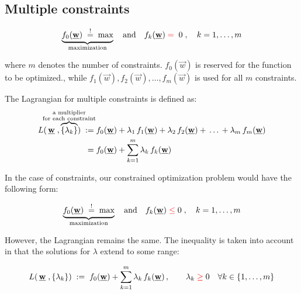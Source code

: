 \subsection{Multiple constraints}

\begin{frame}
 

\slidesonly{\vspace{-2mm}}
    
\begin{equation}
\underbrace{f_0(\vec w) \;\eqexcl\; \text{max}}_{\text{maximization}} \quad  \text{and} \quad f_k(\vec w)\;{\color{red}{=}}\; \; 0 \;, \quad k = 1,\ldots,m
\label{eq:optimizationequalitymultipe}
\end{equation}

where $m$ denotes the number of constraints. $f_{0}(\vec w)$ is reserved for the function to be optimized., while $f_{1}(\vec w), f_{2}(\vec w),\ldots,f_{m}(\vec w)$ is used for all $m$ constraints.

The Lagrangian for multiple constraints is defined as:
\begin{align}
L(\,\vec w\;, \overbrace{\{\lambda_k\}}^{
\mathclap{
\substack{\text{a multiplier} \\
\text{for each constraint}}
}
}) 
\; :=& \; 
f_0(\vec w) + \lambda_1 \, f_1(\vec w) + \lambda_2 \, f_2(\vec w) + \, \ldots \, + \lambda_m \, f_m(\vec w) \\
\; =& \; 
f_0(\vec w) + \sum_{k=1}^{m} \lambda_k \, f_k(\vec w)
\label{eq:lagrangianmultiple}
\end{align}


\end{frame}

\begin{frame}

In the case of {\color{red}{inequality}} constraints, our constrained optimization problem would have the following form:

\begin{equation}
\underbrace{f_0(\vec w) \;\eqexcl\; \text{max}}_{\text{maximization}} \quad  \text{and} \quad f_k(\vec w)\; {\color{red}{\le}} \; 0 \;, \quad k = 1,\ldots,m{}
\label{eq:optimizationINequalitymultipe}
\end{equation}

However, the Lagrangian remains the same. The inequality is taken into account in that the solutions for $\lambda$ extend to some range:

\begin{equation}
L(\,\vec w\;, \{\lambda_k\}
) \; := \; f_0(\vec w) + \sum_{k=1}^{m} \lambda_k \, f_k(\vec w)\,,\qquad
\lambda_{k} \;{\color{red}{\ge}}\; 0 \quad \forall k \in \{1,\ldots,m\}
\label{eq:lagrangianINequalitymultiple}
\end{equation}
 
    
\end{frame}
